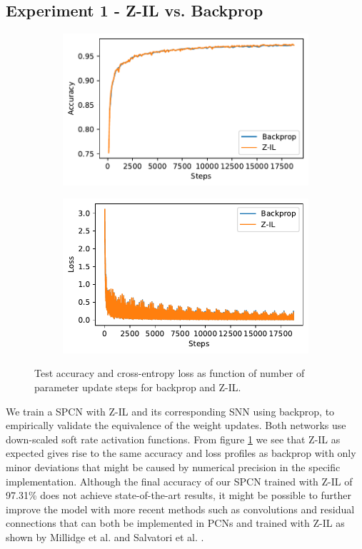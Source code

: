 \documentclass[a4paper,11pt]{article}
\begin{document}
\subsection{Experiment 1 - Z-IL vs. Backprop}
\begin{figure}[ht]
  \begin{subfigure}[]{0.49\linewidth}
    \includegraphics[width=\linewidth]{graphics/Z-IL-backprop-accuracy.pdf}
  \end{subfigure}
  \hfill
  \begin{subfigure}[]{0.49\linewidth}
    \includegraphics[width=\linewidth]{graphics/Z-IL-backprop-loss.pdf}
  \end{subfigure}

  \caption{Test accuracy and cross-entropy loss as function of number of parameter update steps for backprop and Z-IL.}
  \label{fig:Z-IL-backprop-comparison}
\end{figure} 
We train a SPCN with Z-IL and its corresponding SNN using backprop, to empirically validate the equivalence of the weight updates. Both networks use down-scaled soft rate activation functions. From figure \ref{fig:Z-IL-backprop-comparison} we see that Z-IL as expected gives rise to the same accuracy and loss profiles as backprop with only minor deviations that might be caused by numerical precision in the specific implementation. Although the final accuracy of our SPCN trained with Z-IL of 97.31\% does not achieve state-of-the-art results, it might be possible to further improve the model with more recent methods such as convolutions and residual connections that can both be implemented in PCNs and trained with Z-IL as shown by Millidge et al. \cite{milladge2020predictive} and Salvatori et al. \cite{salvatori2021reverse}. 
\end{document}
